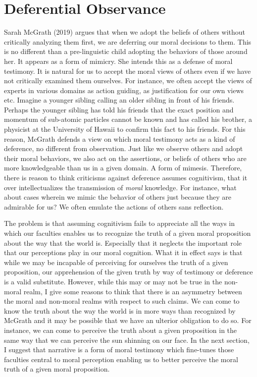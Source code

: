 \documentclass[12pt]{book}
\theoremstyle{definition}
\theoremstyle{remark}
\begin{document}
\chapter{Deferential Observance}\label{deferential-observance}

Sarah McGrath (2019) argues that when we adopt the beliefs of others without critically analyzing them first, we are deferring our moral decisions to them. This is no different than a pre-linguistic child adopting the behaviors of those around her. It appears as a form of mimicry. She intends this as a defense of moral testimony. It is natural for us to accept the moral views of others even if we have not critically examined them ourselves. For instance, we often accept the views of experts in various domains as action guiding, as justification for our own views etc. Imagine a younger sibling calling an older sibling in front of his friends. Perhaps the younger sibling has told his friends that the exact position and momentum of sub-atomic particles cannot be known and has called his brother, a physicist at the University of Hawaii to confirm this fact to his friends. For this reason, McGrath defends a view on which moral testimony acts as a kind of deference, no different from observation. Just like we observe others and adopt their moral behaviors, we also act on the assertions, or beliefs of others who are more knowledgeable than us in a given domain. A form of mimesis. Therefore, there is reason to think criticisms against deference assumes cognitivism, that it over intellectualizes the transmission of \emph{moral} knowledge. For instance, what about cases wherein we mimic the behavior of others just because they are admirable for us? We often emulate the actions of others sans reflection.

The problem is that assuming cognitivism fails to appreciate all the ways in which our faculties enables us to recognize the truth of a given moral proposition about the way that the world is. Especially that it neglects the important role that our perceptions play in our moral cognition. What it in effect says is that while we may be incapable of perceiving for ourselves the truth of a given proposition, our apprehension of the given truth by way of testimony or deference is a valid substitute. However, while this may or may not be true in the non-moral realm, I give some reasons to think that there is an asymmetry between the moral and non-moral realms with respect to such claims. We can come to know the truth about the way the world is in more ways than recognized by McGrath and it may be possible that we have an ulterior obligation to do so. For instance, we can come to perceive the truth about a given proposition in the same way that we can perceive the sun shinning on our face. In the next section, I suggest that narrative is a form of moral testimony which fine-tunes those faculties central to moral perception enabling us to better perceive the moral truth of a given moral proposition.
\end{document}
